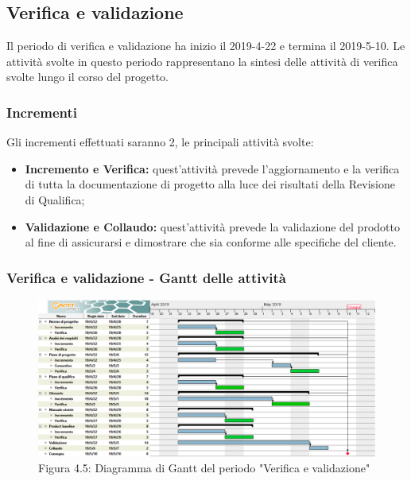 \subsection{Verifica e validazione}
Il periodo di verifica e validazione ha inizio il 2019-4-22 e termina il 2019-5-10.
Le attività svolte in questo periodo rappresentano la sintesi delle attività di verifica svolte lungo il corso del progetto.

\subsubsection{Incrementi}
Gli incrementi effettuati saranno 2, le principali attività svolte:
\begin{itemize}

	\item \textbf{Incremento e Verifica:} quest'attività prevede l'aggiornamento e la verifica di tutta la documentazione di progetto alla luce dei risultati della Revisione di Qualifica;

	\item \textbf{Validazione e Collaudo:} quest'attività prevede la validazione del prodotto al fine di assicurarsi e dimostrare che sia conforme alle specifiche del cliente.

\end{itemize}
 
 \subsubsection{Verifica e validazione - Gantt delle attività}

\begin{figure} [H]
	\centering
	\includegraphics[scale=0.35]{Res/Gantt/Validazione}
	\caption{Figura 4.5: Diagramma di Gantt del periodo "Verifica e validazione"}\label{}
\end{figure}

 
\pagebreak
